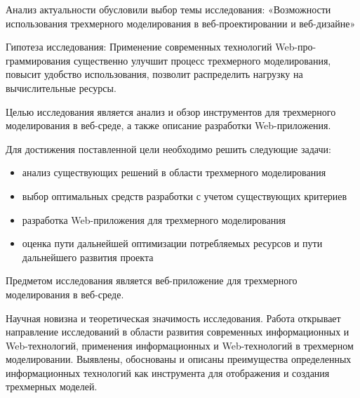 Анализ актуальности обусловили выбор темы исследования: «Возможности использования трехмерного моделирования в веб-проектировании и веб-дизайне»

Гипотеза исследования: Применение современных технологий Web-про-граммирования существенно улучшит процесс трехмерного моделирования, повысит удобство использования, позволит распределить 
нагрузку на вычислительные ресурсы.

Целью исследования является анализ и обзор инструментов для трехмерного моделирования в веб-среде, а также описание разработки Web-приложения.

Для достижения поставленной цели необходимо решить следующие задачи:  
\begin{itemize}
\item анализ существующих решений в области трехмерного моделирования
\item выбор оптимальных средств разработки с учетом существующих критериев  
\item разработка Web-приложения для трехмерного моделирования  
\item оценка пути дальнейшей оптимизации потребляемых ресурсов и пути дальнейшего развития проекта
\end{itemize}

Предметом исследования является веб-приложение для трехмерного моделирования в веб-среде.

Научная новизна и теоретическая значимость исследования. Работа открывает направление исследований в области развития современных информационных и Web-технологий, применения информационных 
и Web-технологий в трехмерном моделировании. Выявлены, обоснованы и описаны преимущества определенных информационных технологий как инструмента 
для отображения и создания трехмерных моделей. 

